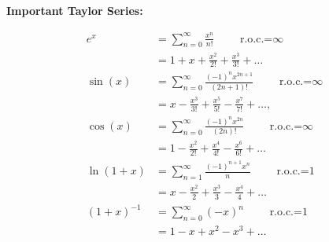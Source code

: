 \documentclass{article}
\begin{document}
\textbf{Important Taylor Series:}

\vspace{5mm}

\begin{align*}
	e^x&=\sum_{n=0}^\infty \frac{x^n}{n!}\qquad\mbox{ r.o.c.=$\infty$}\\
	&=1+x+\frac{x^2}{2!}+\frac{x^3}{3!}+\hdots\\
	\sin(x)&=\sum_{n=0}^\infty \frac{(-1)^{n}x^{2n+1}}{(2n+1)!}\qquad\mbox{ r.o.c.=$\infty$}\\
	&=x-\frac{x^3}{3!}+\frac{x^5}{5!}-\frac{x^7}{7!}+\hdots,\\
	\cos(x)&=\sum_{n=0}^\infty \frac{(-1)^n x^{2n}}{(2n)!}\qquad\mbox{ r.o.c.=$\infty$}\\
	&= 1-\frac{x^2}{2!}+\frac{x^4}{4!}-\frac{x^6}{6!}+\hdots\\
	\ln(1+x)&=\sum_{n=1}^\infty \frac{(-1)^{n+1}x^n}{n}\qquad\mbox{ r.o.c.=$1$}\\
	&=x-\frac{x^2}{2}+\frac{x^3}{3}-\frac{x^4}{4}+\hdots\\
	(1+x)^{-1}&=\sum_{n=0}^\infty (-x)^n\qquad\mbox{ r.o.c.=$1$}\\
	&= 1 -x+x^2-x^3+\hdots
\end{align*}
\end{document}
